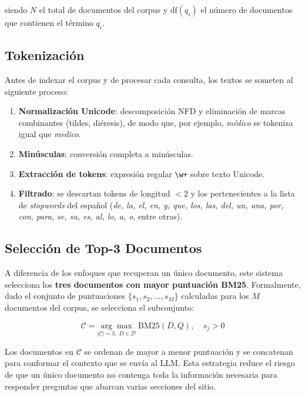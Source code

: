\documentclass[conference]{IEEEtran}
\newcommand{\code}[1]{\texttt{\small #1}}
\begin{document}
siendo $N$ el total de documentos del corpus y $\mathrm{df}(q_i)$ el número
de documentos que contienen el término $q_i$.

\subsection{Tokenización}

Antes de indexar el corpus y de procesar cada consulta, los textos se
someten al siguiente proceso:

\begin{enumerate}
    \item \textbf{Normalización Unicode}: descomposición NFD y eliminación de
          marcas combinantes (tildes, diéresis), de modo que, por ejemplo,
          \textit{médico} se tokeniza igual que \textit{medico}.
    \item \textbf{Minúsculas}: conversión completa a minúsculas.
    \item \textbf{Extracción de tokens}: expresión regular \code{\textbackslash w+}
          sobre texto Unicode.
    \item \textbf{Filtrado}: se descartan tokens de longitud $< 2$ y los
          pertenecientes a la lista de \textit{stopwords} del español
          (\textit{de, la, el, en, y, que, los, las, del, un, una, por, con,
          para, se, su, es, al, lo, a, o}, entre otras).
\end{enumerate}

\subsection{Selección de Top-3 Documentos}

A diferencia de los enfoques que recuperan un único documento, este sistema
selecciona los \textbf{tres documentos con mayor puntuación BM25}. Formalmente,
dado el conjunto de puntuaciones $\{s_1, s_2, \ldots, s_M\}$ calculadas para
los $M$ documentos del corpus, se selecciona el subconjunto:

\begin{equation}
\mathcal{C}
= \underset{|\mathcal{C}|=3,\; D \in \mathcal{D}}{\arg\max}\;
  \mathrm{BM25}(D, Q),
\quad s_j > 0
\label{eq:top3}
\end{equation}

Los documentos en $\mathcal{C}$ se ordenan de mayor a menor puntuación y se
concatenan para conformar el contexto que se envía al LLM. Esta estrategia
reduce el riesgo de que un único documento no contenga toda la información
necesaria para responder preguntas que abarcan varias secciones del sitio.
\end{document}
